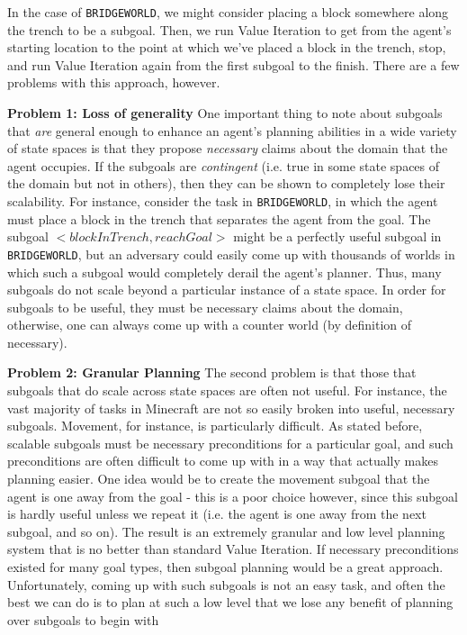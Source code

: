 \documentclass[]{article}
\begin{document}

In the case of \texttt{BRIDGEWORLD}, we might consider placing a block somewhere along the trench to be a subgoal. Then, we run Value Iteration to get from the agent's starting location to the point at which we've placed a block in the trench, stop, and run Value Iteration again from the first subgoal to the finish. There are a few problems with this approach, however.


{\bf Problem 1: Loss of generality}  One important thing to note about subgoals that {\it are} general enough to enhance an agent's planning abilities in a wide variety of state spaces is that they propose {\it necessary} claims about the domain that the agent occupies. If the subgoals are {\it contingent} (i.e. true in some state spaces of the domain but not in others), then they can be shown to completely lose their scalability. For instance, consider the task in \texttt{BRIDGEWORLD}, in which the agent must place a block in the trench that separates the agent from the goal. The subgoal $<blockInTrench, reachGoal>$ might be a perfectly useful subgoal in \texttt{BRIDGEWORLD}, but an adversary could easily come up with thousands of worlds in which such a subgoal would completely derail the agent's planner. Thus, many subgoals do not scale beyond a particular instance of a state space. In order for subgoals to be useful, they must be necessary claims about the domain, otherwise, one can always come up with a counter world (by definition of necessary). 

{\bf Problem 2: Granular Planning} The second problem is that those that subgoals that do scale across state spaces are often not useful. For instance, the vast majority of tasks in Minecraft are not so easily broken into useful, necessary subgoals. Movement, for instance, is particularly difficult. As stated before, scalable subgoals must be necessary preconditions for a particular goal, and such preconditions are often difficult to come up with in a way that actually makes planning easier. One idea would be to create the movement subgoal that the agent is one away from the goal - this is a poor choice however, since this subgoal is hardly useful unless we repeat it (i.e. the agent is one away from the next subgoal, and so on). The result is an extremely granular and low level planning system that is no better than standard Value Iteration. If necessary preconditions existed for many goal types, then subgoal planning would be a great approach. Unfortunately, coming up with such subgoals is not an easy task, and often the best we can do is to plan at such a low level that we lose any benefit of planning over subgoals to begin with
\end{document}
